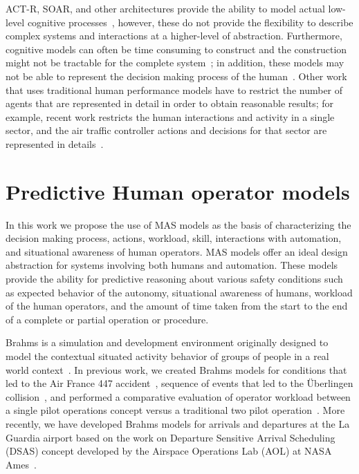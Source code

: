 \documentclass[12pt]{article}
\begin{document}
ACT-R, SOAR, and other architectures provide the ability to model actual low-level cognitive processes~\cite{anderson1997act,laird1987soar,lebiere2013cognitive,liu2009qn,lundinsimulating},
however, these do not provide the flexibility to describe complex systems and interactions at a higher-level of abstraction. Furthermore, cognitive models can often be time consuming to construct and the construction might not be tractable for the complete system~\cite{lebiere2013cognitive}; in addition, these models may not be able to represent the decision making process of the human~\cite{pritchett2011simulating}. Other work that uses traditional human performance models have to restrict the number of agents that are represented in detail in order to obtain reasonable results; for example, recent work restricts the human interactions and activity in a single sector, and the air traffic controller actions and decisions for that sector are represented in details~\cite{MIDAS}. 


\section{Predictive Human operator models} 

In this work we propose the use of MAS models as the basis of
characterizing the decision making process, actions, workload, skill,
interactions with automation, and situational awareness of human
operators.  MAS models offer an ideal design abstraction for systems
involving both humans and automation. These models provide the ability
for predictive reasoning about various safety conditions such as
expected behavior of the autonomy, situational awareness of humans,
workload of the human operators, and the amount of time taken from the
start to the end of a complete or partial operation or procedure.

Brahms is a simulation and development environment originally designed
to model the contextual situated activity behavior of groups of people
in a real world context~\cite{clancey1998brahms,SierhuisPhD}. In previous work, we created Brahms models for conditions that led to the Air France 447 accident~\cite{hunter:aamas13}, sequence of events that led to the \"{U}berlingen collision~\cite{Rungta:2013}, and performed a comparative evaluation of operator workload between a single pilot operations concept versus a traditional two pilot operation~\cite{Stocker:2015}. More recently, we have developed Brahms models for arrivals and departures at the La Guardia airport based on the work on Departure Sensitive Arrival Scheduling (DSAS) concept developed by the Airspace Operations Lab (AOL) at NASA Ames~\cite{dsas}. 
\end{document}

